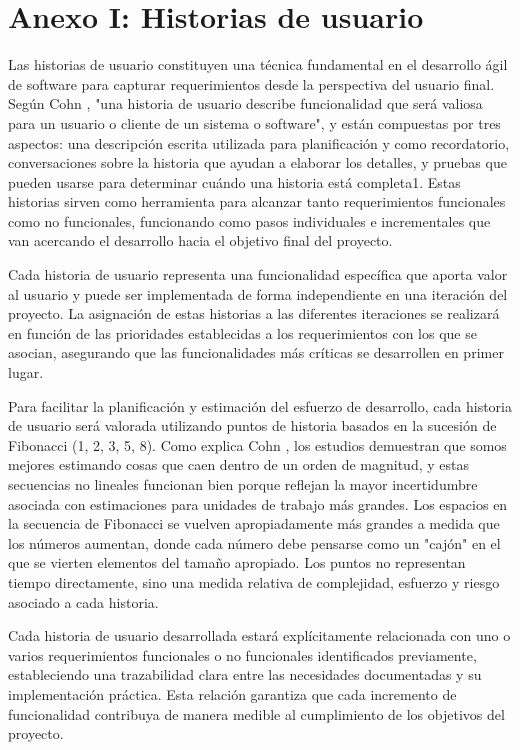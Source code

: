 \section*{Anexo I: Historias de usuario}
{}
\label{sec:anexo-historias-usuario}

Las historias de usuario constituyen una técnica fundamental en el desarrollo ágil de software para capturar requerimientos desde la perspectiva del usuario final. Según Cohn \cite{Cohn2004}, "una historia de usuario describe funcionalidad que será valiosa para un usuario o cliente de un sistema o software", y están compuestas por tres aspectos: una descripción escrita utilizada para planificación y como recordatorio, conversaciones sobre la historia que ayudan a elaborar los detalles, y pruebas que pueden usarse para determinar cuándo una historia está completa1. Estas historias sirven como herramienta para alcanzar tanto requerimientos funcionales como no funcionales, funcionando como pasos individuales e incrementales que van acercando el desarrollo hacia el objetivo final del proyecto.

Cada historia de usuario representa una funcionalidad específica que aporta valor al usuario y puede ser implementada de forma independiente en una iteración del proyecto. La asignación de estas historias a las diferentes iteraciones se realizará en función de las prioridades establecidas a los requerimientos con los que se asocian, asegurando que las funcionalidades más críticas se desarrollen en primer lugar.

Para facilitar la planificación y estimación del esfuerzo de desarrollo, cada historia de usuario será valorada utilizando puntos de historia basados en la sucesión de Fibonacci (1, 2, 3, 5, 8). Como explica Cohn \cite{Cohn2005}, los estudios demuestran que somos mejores estimando cosas que caen dentro de un orden de magnitud, y estas secuencias no lineales funcionan bien porque reflejan la mayor incertidumbre asociada con estimaciones para unidades de trabajo más grandes. Los espacios en la secuencia de Fibonacci se vuelven apropiadamente más grandes a medida que los números aumentan, donde cada número debe pensarse como un "cajón" en el que se vierten elementos del tamaño apropiado. Los puntos no representan tiempo directamente, sino una medida relativa de complejidad, esfuerzo y riesgo asociado a cada historia.

Cada historia de usuario desarrollada estará explícitamente relacionada con uno o varios requerimientos funcionales o no funcionales identificados previamente, estableciendo una trazabilidad clara entre las necesidades documentadas y su implementación práctica. Esta relación garantiza que cada incremento de funcionalidad contribuya de manera medible al cumplimiento de los objetivos del proyecto.


